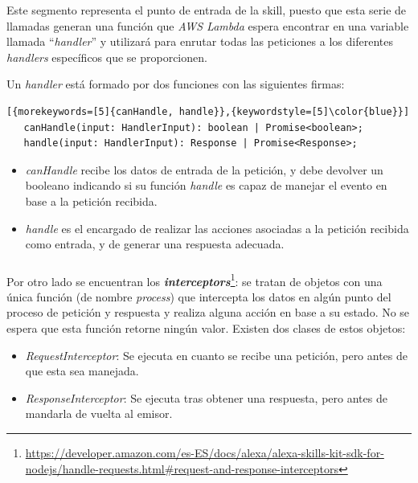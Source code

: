 \documentclass[11pt,spanish,listoffigures,listoftables,table,hyphens,dvipsnames]{tfgetsinf}
\newcommand{\fe}[1]{\foreign{english}{#1}}
\begin{document}
Este segmento representa el punto de entrada de la skill, puesto que esta serie de llamadas generan una función que \emph{AWS Lambda} espera encontrar en una variable llamada ``\emph{handler}'' y utilizará para enrutar todas las peticiones a los diferentes \emph{handlers} específicos que se proporcionen.

Un \emph{handler} está formado por dos funciones con las siguientes firmas:

\begin{lstlisting}[{morekeywords=[5]{canHandle, handle}},{keywordstyle=[5]\color{blue}}]
   canHandle(input: HandlerInput): boolean | Promise<boolean>;
   handle(input: HandlerInput): Response | Promise<Response>;
\end{lstlisting}

\begin{itemize}
   \item \emph{canHandle} recibe los datos de entrada de la petición, y debe devolver un booleano indicando si su función \emph{handle} es capaz de manejar el evento en base a la petición recibida.
   \item \emph{handle} es el encargado de realizar las acciones asociadas a la petición recibida como entrada, y de generar una respuesta adecuada. 
\end{itemize}

\subsubsection{\fe{Interceptors}}

\label{def:interceptors}
Por otro lado se encuentran los
\textbf{\emph{interceptors}}\footnote{\url{https://developer.amazon.com/es-ES/docs/alexa/alexa-skills-kit-sdk-for-nodejs/handle-requests.html\#request-and-response-interceptors}}:
se tratan de objetos con una única función (de nombre \emph{process}) que intercepta los datos en algún punto del proceso de petición y respuesta y realiza alguna acción en base a su estado. No se espera que esta función retorne ningún valor. Existen dos clases de estos objetos:

\begin{itemize}
   \item \emph{RequestInterceptor}: Se ejecuta en cuanto se recibe una petición, pero antes de que esta sea manejada.
   \item \emph{ResponseInterceptor}: Se ejecuta tras obtener una respuesta, pero antes de mandarla de vuelta al emisor.
\end{itemize}
\end{document}
